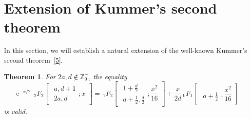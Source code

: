 \documentclass[reqno]{amsart}
\numberwithin{equation}{section}
\theoremstyle{plain}
\newtheorem{thm}{Theorem}[section]
\theoremstyle{remark}
\DeclareMathOperator{\te}{e}
\begin{document}
\section{Extension of Kummer's second theorem}\label{sec-kummer}
In this section, we will establish a natural extension of the well-known Kummer's second theorem~\eqref{5}.

\begin{thm}\label{Kummer-extension-thm}
For $2a,d\not\in\mathbb{Z}_0^-$, the equality
\begin{equation}\label{Kummer-extension-Eq}
\te^{-x/2}{\,}_2F_2\begin{bmatrix}
\begin{gathered}
a,d+1\\ 2a, d
\end{gathered};x
\end{bmatrix}
={\,}_1F_2\begin{bmatrix}
\begin{gathered}
1+\tfrac{d}{2}\\ a+\tfrac{1}{2},\tfrac{d}{2}
\end{gathered};\dfrac{x^2}{16}
\end{bmatrix}
+\frac{x}{2d}{\,}_0F_1\begin{bmatrix}
\begin{gathered}
\\ a+\tfrac{1}{2}
\end{gathered};\dfrac{x^2}{16}
\end{bmatrix}
\end{equation}
is valid.
\end{thm}
\end{document}
